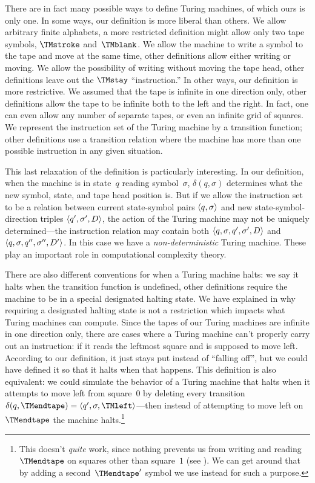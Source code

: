 \documentclass[../../../include/open-logic-section]{subfiles}
\begin{document}

There are in fact many possible ways to define Turing machines, of
which ours is only one.  In some ways, our definition is more liberal
than others. We allow arbitrary finite alphabets, a more restricted
definition might allow only two tape symbols, $\TMstroke$
and~$\TMblank$.  We allow the machine to write a symbol to the tape
and move at the same time, other definitions allow either writing or
moving.  We allow the possibility of writing without moving the tape
head, other definitions leave out the $\TMstay$ ``instruction.''  In
other ways, our definition is more restrictive. We assumed that the
tape is infinite in one direction only, other definitions allow the
tape to be infinite both to the left and the right. In fact, one can
even allow any number of separate tapes, or even an infinite grid of
squares.  We represent the instruction set of the Turing machine by a
transition function; other definitions use a transition relation where
the machine has more than one possible instruction in any given
situation.

This last relaxation of the definition is particularly interesting.
In our definition, when the machine is in state~$q$ reading
symbol~$\sigma$, $\delta(q, \sigma)$ determines what the new symbol,
state, and tape head position is.  But if we allow the instruction set
to be a relation between current state-symbol pairs $\langle q,
  \sigma \rangle$ and new state-symbol-direction triples $\langle q', \sigma',
  D \rangle$, the action of the Turing machine may not be uniquely
determined---the instruction relation may contain both $\langle q,
  \sigma, q', \sigma', D \rangle$ and $\langle q, \sigma, q'', \sigma'', D' \rangle$.
In this case we have a \emph{non-deterministic} Turing machine.  These
play an important role in computational complexity theory.

There are also different conventions for when a Turing machine halts:
we say it halts when the transition function is undefined, other
definitions require the machine to be in a special designated halting
state. We have explained in  why requiring a
designated halting state is not a restriction which impacts what
Turing machines can compute.  Since the tapes of our Turing machines
are infinite in one direction only, there are cases where a Turing
machine can't properly carry out an instruction: if it reads the
leftmost square and is supposed to move left. According to our
definition, it just stays put instead of ``falling off'', but we could
have defined it so that it halts when that happens. This definition is
also equivalent: we could simulate the behavior of a Turing machine
that halts when it attempts to move left from square~$0$ by deleting
every transition $\delta(q,\TMendtape) =
\tuple{q',\sigma,\TMleft}$---then instead of attempting to move left
on~$\TMendtape$ the machine halts.\footnote{This doesn't \emph{quite}
work, since nothing prevents us from writing and reading $\TMendtape$
on squares other than square~$1$ (see ). We can
get around that by adding a second~$\TMendtape'$ symbol we use instead
for such a purpose.}
\end{document}
